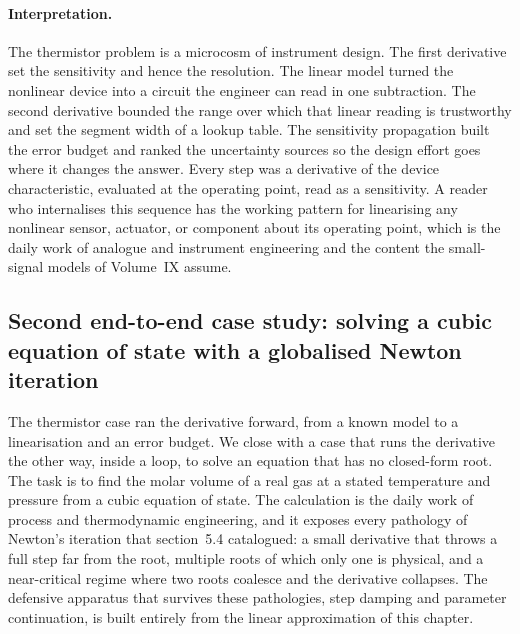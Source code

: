 \paragraph{Interpretation.}
The thermistor problem is a microcosm of instrument design. The
first derivative set the sensitivity and hence the resolution. The
linear model turned the nonlinear device into a circuit the
engineer can read in one subtraction. The second derivative bounded
the range over which that linear reading is trustworthy and set the
segment width of a lookup table. The sensitivity propagation built
the error budget and ranked the uncertainty sources so the design
effort goes where it changes the answer. Every step was a
derivative of the device characteristic, evaluated at the operating
point, read as a sensitivity. A reader who internalises this
sequence has the working pattern for linearising any nonlinear
sensor, actuator, or component about its operating point, which is
the daily work of analogue and instrument engineering and the
content the small-signal models of Volume~IX assume.

\subsection{Second end-to-end case study: solving a cubic equation of
state with a globalised Newton iteration}

The thermistor case ran the derivative forward, from a known model to a
linearisation and an error budget. We close with a case that runs the
derivative the other way, inside a loop, to solve an equation that has
no closed-form root. The task is to find the molar volume of a real gas
at a stated temperature and pressure from a cubic equation of state.
The calculation is the daily work of process and thermodynamic
engineering, and it exposes every pathology of Newton's iteration that
section~5.4 catalogued: a small derivative that throws a full step far
from the root, multiple roots of which only one is physical, and a
near-critical regime where two roots coalesce and the derivative
collapses. The defensive apparatus that survives these pathologies,
step damping and parameter continuation, is built entirely from the
linear approximation of this chapter.

